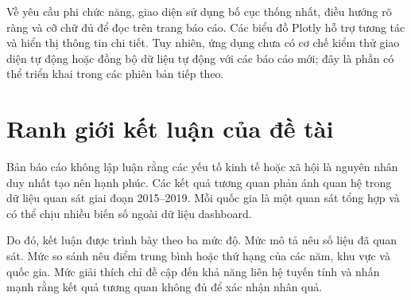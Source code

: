 Về yêu cầu phi chức năng, giao diện sử dụng bố cục thống nhất, điều hướng rõ ràng và cỡ chữ đủ để đọc trên trang báo cáo. Các biểu đồ Plotly hỗ trợ tương tác và hiển thị thông tin chi tiết. Tuy nhiên, ứng dụng chưa có cơ chế kiểm thử giao diện tự động hoặc đồng bộ dữ liệu tự động với các báo cáo mới; đây là phần có thể triển khai trong các phiên bản tiếp theo.

\section{Ranh giới kết luận của đề tài}

Bản báo cáo không lập luận rằng các yếu tố kinh tế hoặc xã hội là nguyên nhân duy nhất tạo nên hạnh phúc. Các kết quả tương quan phản ánh quan hệ trong dữ liệu quan sát giai đoạn 2015--2019. Mỗi quốc gia là một quan sát tổng hợp và có thể chịu nhiều biến số ngoài dữ liệu dashboard.

Do đó, kết luận được trình bày theo ba mức độ. Mức mô tả nêu số liệu đã quan sát. Mức so sánh nêu điểm trung bình hoặc thứ hạng của các năm, khu vực và quốc gia. Mức giải thích chỉ đề cập đến khả năng liên hệ tuyến tính và nhấn mạnh rằng kết quả tương quan không đủ để xác nhận nhân quả.
